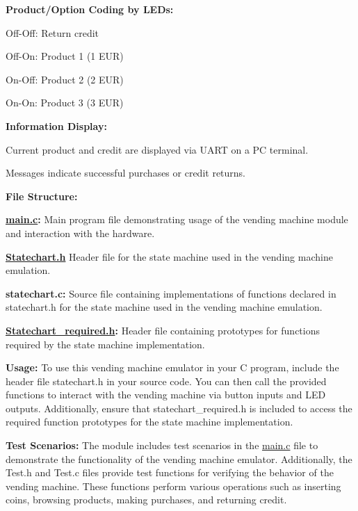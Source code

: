 \begin{DoxyItemize}
\item {\bfseries{Product/\+Option Coding by LEDs\+:}}
\begin{DoxyItemize}
\item Off-\/\+Off\+: Return credit
\item Off-\/\+On\+: Product 1 (1 EUR)
\item On-\/\+Off\+: Product 2 (2 EUR)
\item On-\/\+On\+: Product 3 (3 EUR)
\end{DoxyItemize}
\item {\bfseries{Information Display\+:}}
\begin{DoxyItemize}
\item Current product and credit are displayed via UART on a PC terminal.
\item Messages indicate successful purchases or credit returns.
\end{DoxyItemize}
\end{DoxyItemize}

{\bfseries{File Structure\+:}}
\begin{DoxyItemize}
\item {\bfseries{\mbox{\hyperlink{main_8c}{main.\+c}}\+:}} Main program file demonstrating usage of the vending machine module and interaction with the hardware.
\item {\bfseries{\mbox{\hyperlink{Statechart_8h}{Statechart.\+h}}}} Header file for the state machine used in the vending machine emulation.
\item {\bfseries{statechart.\+c\+:}} Source file containing implementations of functions declared in statechart.\+h for the state machine used in the vending machine emulation.
\item {\bfseries{\mbox{\hyperlink{Statechart__required_8h}{Statechart\+\_\+required.\+h}}\+:}} Header file containing prototypes for functions required by the state machine implementation.
\end{DoxyItemize}

{\bfseries{Usage\+:}} To use this vending machine emulator in your C program, include the header file statechart.\+h in your source code. You can then call the provided functions to interact with the vending machine via button inputs and LED outputs. Additionally, ensure that statechart\+\_\+required.\+h is included to access the required function prototypes for the state machine implementation.

{\bfseries{Test Scenarios\+:}} The module includes test scenarios in the \mbox{\hyperlink{main_8c}{main.\+c}} file to demonstrate the functionality of the vending machine emulator. Additionally, the Test.\+h and Test.\+c files provide test functions for verifying the behavior of the vending machine. These functions perform various operations such as inserting coins, browsing products, making purchases, and returning credit.

